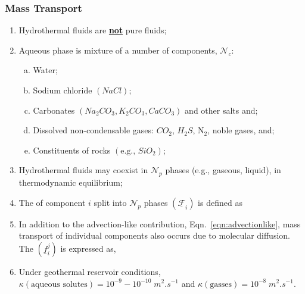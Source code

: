 \documentclass[10pt,compress,unknownkeysallowed]{beamer}
\begin{document}
\begin{frame}
 \frametitle{Mass Transport}
    \begin{enumerate}[1.]\scriptsize
       \item <1-> Hydrothermal fluids are {\bf \underline{not}} pure fluids;
       \item <2-> Aqueous phase is mixture of a number of components, $\mathcal{N}_{c}$:
          \begin{enumerate}[(a)]\scriptsize
             \item <2-> Water;
             \item <2-> Sodium chloride $\left(NaCl\right)$;
             \item <2-> Carbonates $\left(Na_{2}CO_{3}, K_{2}CO_{3}, CaCO_{3}\right)$ and other salts and;
             \item <3-> Dissolved non-condensable gases: $CO_{2}$, $H_{2}S$, N$_{2}$, noble gases, and;
             \item <4-> Constituents of rocks $\left(\text{e.g., }SiO_{2}\right)$;
          \end{enumerate}
       \item <5-> Hydrothermal fluids may coexist in $\mathcal{N}_{p}$ phases (e.g., gaseous, liquid), in thermodynamic equilibrium; 
       \item <6-> The  of component $i$ split into $\mathcal{N}_{p}$ phases $\left(\underline{\mathcal{F}}_{i}\right)$ is defined as
       \item <7-> In addition to the advection-like contribution, Eqn.~\ref{eqn:advectionlike}, mass transport of individual components also occurs due to molecular diffusion. The  $\left(\underline{f}_{i}^{j}\right)$ is expressed as,
       \item <8-> Under geothermal reservoir conditions, $\kappa\left(\text{aqueous solutes}\right) = 10^{-9}-10^{-10}\;m^{2}.s^{-1}$ and $\kappa\left(\text{gasses}\right) = 10^{-8}\;m^{2}.s^{-1}$.
    \end{enumerate}

\end{frame}
\end{document}
